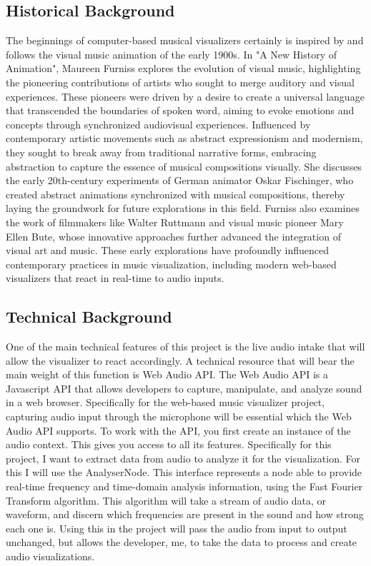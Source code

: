 \documentclass[10pt,twocolumn]{article}
\begin{document}
\subsection{Historical Background}
The beginnings of computer-based musical visualizers certainly is inspired by and follows the visual music animation of the early 1900s. In "A New History of Animation", Maureen Furniss explores the evolution of visual music, highlighting the pioneering contributions of artists who sought to merge auditory and visual experiences. These pioneers were driven by a desire to create a universal language that transcended the boundaries of spoken word, aiming to evoke emotions and concepts through synchronized audiovisual experiences. Influenced by contemporary artistic movements such as abstract expressionism and modernism, they sought to break away from traditional narrative forms, embracing abstraction to capture the essence of musical compositions visually. She discusses the early 20th-century experiments of German animator Oskar Fischinger, who created abstract animations synchronized with musical compositions, thereby laying the groundwork for future explorations in this field. Furniss also examines the work of filmmakers like Walter Ruttmann and visual music pioneer Mary Ellen Bute, whose innovative approaches further advanced the integration of visual art and music. These early explorations have profoundly influenced contemporary practices in music visualization, including modern web-based visualizers that react in real-time to audio inputs.


\subsection{Technical Background}
One of the main technical features of this project is the live audio intake that will allow the visualizer to react accordingly. A technical resource that will bear the main weight of this function is Web Audio API. The Web Audio API is a Javascript API that allows developers to capture, manipulate, and analyze sound in a web browser\cite{noauthor_web_2025}. Specifically for the web-based music visualizer project, capturing audio input through the microphone will be essential which the Web Audio API supports. To work with the API, you first create an instance of the audio context. This gives you access to all its features. Specifically for this project, I want to extract data from audio to analyze it for the visualization. For this I will use the AnalyserNode. This interface represents a node able to provide real-time frequency and time-domain analysis information, using the Fast Fourier Transform algorithm. This algorithm will take a stream of audio data, or waveform, and discern which frequencies are present in the sound and how strong each one is. Using this in the project will pass the audio from input to output unchanged, but allows the developer, me, to take the data to process and create audio visualizations\cite{noauthor_web_2025}. 
\end{document}
